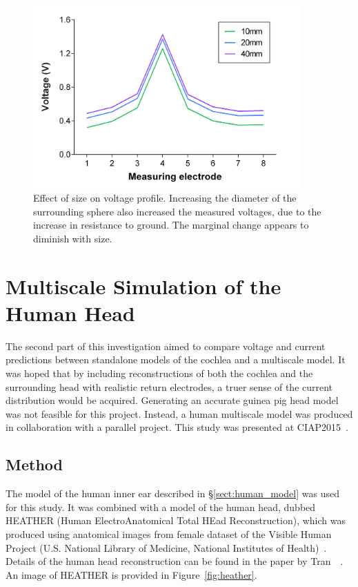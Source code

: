 \begin{figure}
	\centering
	\includegraphics[height=7cm]{Simulations/BCs/bc_redux_size}
	\caption[Effect of size on voltage profile]{Effect of size on voltage profile.
	Increasing the diameter of the surrounding sphere also increased the measured
	voltages, due to the increase in resistance to ground. The marginal change
	appears to diminish with size.}
	\label{fig:bc_size_effect}
\end{figure}

\section{Multiscale Simulation of the Human Head}

The second part of this investigation aimed to compare voltage and current
predictions between standalone models of the cochlea and a multiscale model. It
was hoped that by including reconstructions of both the cochlea and the
surrounding head with realistic return electrodes, a truer sense of the
\invivo{} current distribution would be acquired. Generating an accurate guinea
pig head model was not feasible for this project. Instead, a human multiscale
model was produced in collaboration with a parallel project. This study was
presented at CIAP2015~\cite{tran2015ciap}.

\subsection{Method}

The model of the human inner ear described in \S\ref{sect:human_model} was used
for this study. It was combined with a model of the human head, dubbed HEATHER
(Human ElectroAnatomical Total HEad Reconstruction), which was produced using
anatomical images from female dataset of the Visible Human Project (U.S.
National Library of Medicine, National Institutes of
Health)~\cite{ackerman1997}. Details of the human head reconstruction can be
found in the paper by Tran~\etal~\cite{tran2015}. An image of HEATHER is
provided in Figure~\ref{fig:heather}.

